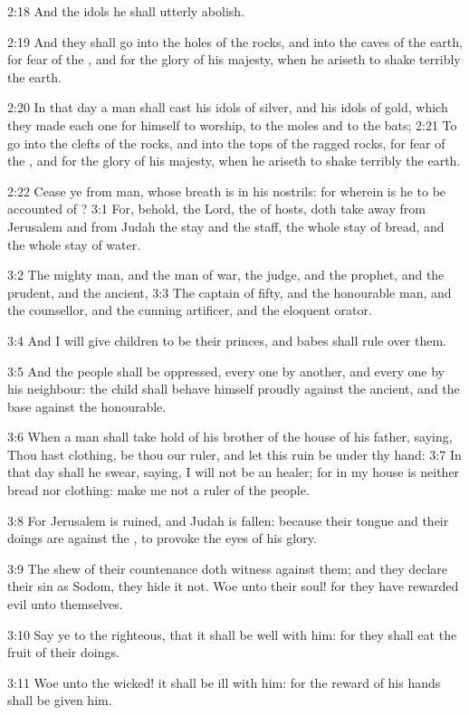 2:18 And the idols he shall utterly abolish.

2:19 And they shall go into the holes of the rocks, and into the caves
of the earth, for fear of the \LORD, and for the glory of his majesty,
when he ariseth to shake terribly the earth.

2:20 In that day a man shall cast his idols of silver, and his idols
of gold, which they made each one for himself to worship, to the moles
and to the bats; 2:21 To go into the clefts of the rocks, and into the
tops of the ragged rocks, for fear of the \LORD, and for the glory of
his majesty, when he ariseth to shake terribly the earth.

2:22 Cease ye from man, whose breath is in his nostrils: for wherein
is he to be accounted of ?  3:1 For, behold, the Lord, the \LORD of
hosts, doth take away from Jerusalem and from Judah the stay and the
staff, the whole stay of bread, and the whole stay of water.

3:2 The mighty man, and the man of war, the judge, and the prophet,
and the prudent, and the ancient, 3:3 The captain of fifty, and the
honourable man, and the counsellor, and the cunning artificer, and the
eloquent orator.

3:4 And I will give children to be their princes, and babes shall rule
over them.

3:5 And the people shall be oppressed, every one by another, and every
one by his neighbour: the child shall behave himself proudly against
the ancient, and the base against the honourable.

3:6 When a man shall take hold of his brother of the house of his
father, saying, Thou hast clothing, be thou our ruler, and let this
ruin be under thy hand: 3:7 In that day shall he swear, saying, I will
not be an healer; for in my house is neither bread nor clothing: make
me not a ruler of the people.

3:8 For Jerusalem is ruined, and Judah is fallen: because their tongue
and their doings are against the \LORD, to provoke the eyes of his
glory.

3:9 The shew of their countenance doth witness against them; and they
declare their sin as Sodom, they hide it not. Woe unto their soul! for
they have rewarded evil unto themselves.

3:10 Say ye to the righteous, that it shall be well with him: for they
shall eat the fruit of their doings.

3:11 Woe unto the wicked! it shall be ill with him: for the reward of
his hands shall be given him.

